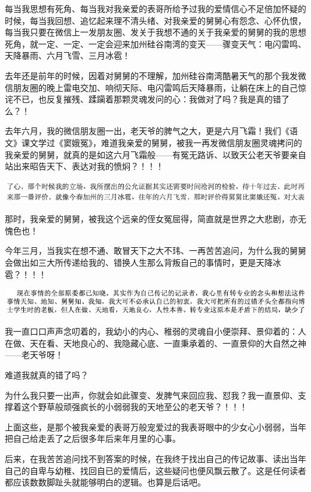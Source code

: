 \documentclass[9pt, b5paper]{article}
\begin{document}
每当我思想有死角、每当我对我亲爱的表哥所给予过我的爱情信心不足倍加怀疑的时候，每当我回想、追忆起来理不清头绪、对我亲爱的舅舅心有怨念、心怀仇恨，每当我只要在微信上一发朋友圈、发关于我想不通的关于我亲爱的舅舅的我的思想死角，就一定、一定、一定会迎来加州硅谷南湾的变天——骤变天气：电闪雷鸣、天降暴雨、六月飞雪、三月冰雹！

去年还是前年的时候，因着对舅舅的不理解，加州硅谷南湾酷暑天气的那个我发微信朋友圈的晚上雷电交加、响彻天际、电闪雷鸣后天降暴雨，让躺在床上的自己惊诧不已，也反复摧残、蹂躏着那颗灵魂发问的心：我做对了吗？我是真的错了么？！

去年六月，我的微信朋友圈一出，老天爷的脾气之大，更是六月飞霜！我们《语文》课文学过《窦娥冤》，难道我亲爱的舅舅，被我一再发微信朋友圈灵魂拷问的我亲爱的舅舅，就真的是如这六月飞霜般——有冤无路诉、以致天公老天爷要亲自站出来昭告天下、表达对我的愤焖？！！！

\begin{center}
\includegraphics[width=.9\linewidth]{./pic/backups_plans_20210423_230138.png}
\end{center}

那时，我亲爱的舅舅，被我这个远亲的侄女冤屈得，简直就是世界之大悲剧，亦无愧色也！

今年三月，当我实在想不通、敢冒天下之大不玮、一再苦苦追问，为什么我的舅舅会做出如三大所传递给我的、错换人生那么背叛自己的事情时，更是天降冰雹？！！！

\begin{center}
\includegraphics[width=.9\linewidth]{./pic/backups_plans_20210422_090142.png}
\end{center}

我一直口口声声念叨着的，我幼小的内心、稚弱的灵魂自小便崇拜、景仰着的：人在做、天在看、天地良心的、我隐藏心底、一直秉承着的、一直景仰的大自然之神——老天爷呀！

难道我就真的错了吗？

为什么我只要一出声，你就会如此骤变、发脾气来回应我、怼我？我一直景仰、支撑着这个野草般顽强疯长的小弱弱我的天地至公的老天爷？！！！

上面这些，是那个被我亲爱的表哥万般宠爱过的我表哥眼中的少女心小弱弱，当年把自己给走丢了之后很多年后来年月里的心事。 

后来，在我苦苦追问找不到答案的时候，在我终于找出自己的传记故事、读出当年自己的自卑与幼稚、找回自已的爱情后，这些疑问也便风飘云散了。这是任何读者都应该数数脚趾头就能够明白的逻辑。也算是后话吧。 
\end{document}
